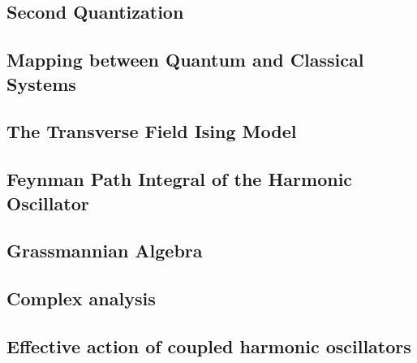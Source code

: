 




% 

\setcounter{section}{2}
\setcounter{subsection}{0}
\subsection{Second Quantization}

\newpage
\subsection{Mapping between Quantum and Classical Systems}



\newpage
\setcounter{section}{3}
\setcounter{subsection}{0}
\subsection{The Transverse Field Ising Model}




\newpage
\setcounter{section}{4}
\setcounter{subsection}{0}
\subsection{Feynman Path Integral of the Harmonic Oscillator}

\subsection{Grassmannian Algebra}





\newpage
\setcounter{section}{5}
\setcounter{subsection}{0}
\subsection{Complex analysis}

\subsection{Effective action of coupled harmonic oscillators}





